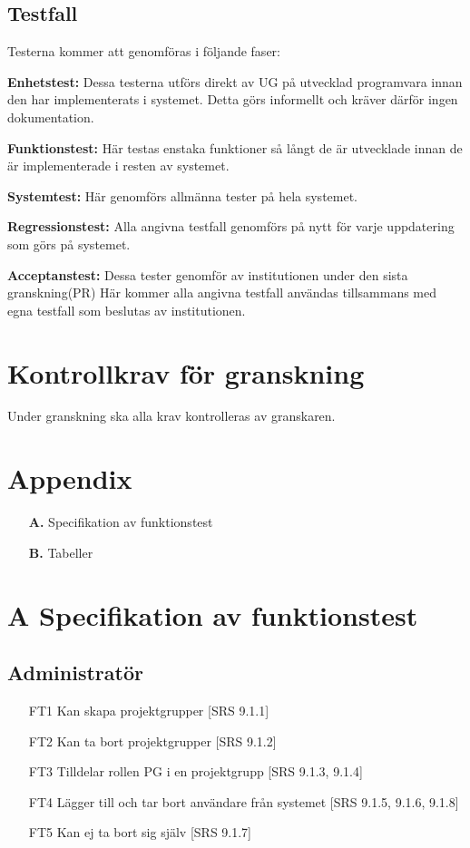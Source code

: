 \documentclass[paper=a4, fontsize=11pt,twoside]{article}
\begin{document}
\subsection{Testfall}

Testerna kommer att genomföras i följande faser:

{\bf Enhetstest:} Dessa testerna utförs direkt av UG på utvecklad programvara
innan den har implementerats i systemet. Detta görs informellt och kräver därför ingen dokumentation.

{\bf Funktionstest:} Här testas enstaka funktioner så långt de är utvecklade
innan de är implementerade i resten av systemet.

{\bf Systemtest:} Här genomförs allmänna tester på hela systemet. 

{\bf Regressionstest:} Alla angivna testfall genomförs på nytt för varje
uppdatering som görs på systemet.

{\bf Acceptanstest:} Dessa tester genomför av institutionen under den sista
granskning(PR) Här kommer alla angivna testfall användas tillsammans med egna testfall som beslutas av institutionen.

 
\section{Kontrollkrav för granskning}

Under granskning ska alla krav kontrolleras av granskaren.

\section{Appendix}

\begin{itemize}
\item[\bf A.] Specifikation av funktionstest
\item[\bf B.] Tabeller
\end{itemize}

\section*{A Specifikation av funktionstest}

\subsection{Administratör}
\begin{itemize}
\item[FT1] Kan skapa projektgrupper [SRS 9.1.1] 
\item[FT2] Kan ta bort projektgrupper [SRS 9.1.2] 
\item[FT3] Tilldelar rollen PG i en projektgrupp [SRS 9.1.3, 9.1.4]
\item[FT4] Lägger till och tar bort användare från systemet [SRS 9.1.5, 9.1.6,
9.1.8]
\item[FT5] Kan ej ta bort sig själv [SRS 9.1.7]
\end{itemize}
\end{document}
